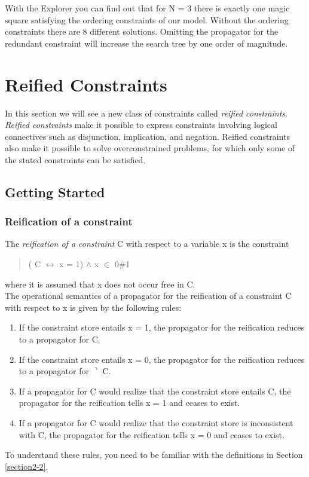 \documentclass[a4paper]{scrartcl}
\begin{document}
With the Explorer you can find out that for N = 3 
there is exactly one magic square satisfying the ordering 
constraints of our model. Without the ordering constraints 
there are 8 different solutions. Omitting the propagator for 
the redundant constraint will increase the search tree by one 
order of magnitude.





\newpage
\section{Reified Constraints}
In this section we will see a new class of constraints called 
{\it reified constraints}. {\it Reified constraints} make it possible to 
express constraints involving logical connectives such as 
disjunction, implication, and negation. Reified constraints 
also make it possible to solve overconstrained problems, 
for which only some of the stated constraints can be satisfied. 

\subsection{Getting Started}
\subsubsection{Reification of a constraint}
The {\it reification of a constraint} C with respect to a variable
x is the constraint 
\begin{quote}
( C $ \leftrightarrow $ x = 1) $ \wedge $ x $\in $ 0$\#$1
\end{quote}
where it is assumed that x does not occur free in C.\\ 
The operational semantics of a propagator for the reification of a
constraint C with respect to x is given by the following rules:
\begin{enumerate} 
\item
If the constraint store entails x = 1, the propagator for the 
reification reduces to a propagator for C.
\item
If the constraint store entails x = 0, the propagator for the 
reification reduces to a propagator for $\urcorner$ C.
\item
If a propagator for C would realize that the constraint store entails 
C, the propagator for the reification tells x = 1 and ceases to exist.
\item
If a propagator for C would realize that the constraint store is 
inconsistent with C, the propagator for the reification tells x = 0  
and ceases to exist.
\end{enumerate}
To understand these rules, you need to be familiar with the definitions 
in Section \ref{section2-2}. 
\end{document}
